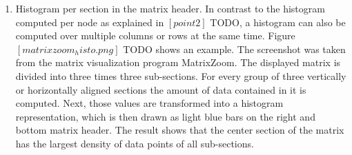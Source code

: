 \begin{enumerate}
	\item Histogram per section in the matrix header. In contrast to the histogram computed per node as explained in $[point 2]$ TODO, a histogram can also be computed over multiple columns or rows at the same time. Figure $[matrixzoom_histo.png]$ TODO shows an example. The screenshot was taken from the matrix visualization program MatrixZoom. The displayed matrix is divided into three times three sub-sections. For every group of three vertically or horizontally aligned sections the amount of data contained in it is computed. Next, those values are transformed into a histogram representation, which is then drawn as light blue bars on the right and bottom matrix header. The result shows that the center section of the matrix has the largest density of data points of all sub-sections.

\end{enumerate}
